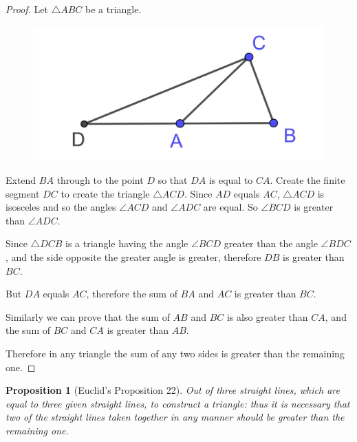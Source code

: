 \documentclass[
]{book}
\newtheorem{proposition}{Proposition}[chapter]
\theoremstyle{definition}
\theoremstyle{definition}
\theoremstyle{definition}
\theoremstyle{definition}
\theoremstyle{remark}
\begin{document}
\begin{proof}
Let \(\triangle ABC\) be a triangle.

\begin{figure}

{\centering \includegraphics[width=0.3\linewidth]{images/prop20} 

}

\end{figure}

Extend \(BA\) through to the point \(D\) so that \(DA\) is equal to \(CA\). Create the finite segment \(DC\) to create the triangle \(\triangle ACD\). Since \(AD\) equals \(AC\), \(\triangle ACD\) is isosceles and so the angles \(\angle ACD\) and \(\angle ADC\) are equal. So \(\angle BCD\) is greater than \(\angle ADC\).

Since \(\triangle DCB\) is a triangle having the angle \(\angle BCD\) greater than the angle \(\angle BDC\), and the side opposite the greater angle is greater, therefore \(DB\) is greater than \(BC\).

But \(DA\) equals \(AC\), therefore the sum of \(BA\) and \(AC\) is greater than \(BC\).

Similarly we can prove that the sum of \(AB\) and \(BC\) is also greater than \(CA\), and the sum of \(BC\) and \(CA\) is greater than \(AB\).

Therefore in any triangle the sum of any two sides is greater than the remaining one.
\end{proof}

\begin{proposition}[Euclid's Proposition 22]
\protect\hypertarget{prp:prop22}{}\label{prp:prop22}Out of three straight lines, which are equal to three given straight lines, to construct a triangle: thus it is necessary that two of the straight lines taken together in any manner should be greater than the remaining one.
\end{proposition}
\end{document}
